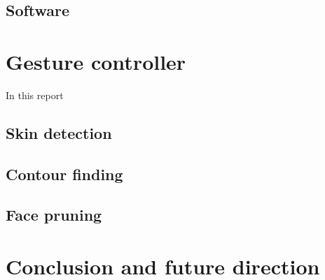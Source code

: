 \documentclass[10pt,twocolumn,letterpaper]{article}
\begin{document}
\subsection{Software}

\section{Gesture controller}
In this report
\subsection{Skin detection}
\subsection{Contour finding}
\subsection{Face pruning}
\subsection{}

\section{Conclusion and future direction}

{\small


}
\end{document}
